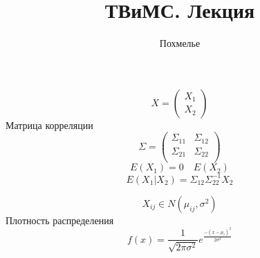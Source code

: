 \documentclass[a4paper]{article}
\begin{document}
\title{ТВиМС. Лекция}
\author{Похмелье}
\maketitle
\[
    X = \begin{pmatrix}
    X_1 \\
    X_2
    
   \end{pmatrix}
\]
Матрица корреляции
\[
    \Sigma = \begin{pmatrix}
    \Sigma_{11} & \Sigma_{12} \\
    \Sigma_{21} & \Sigma_{22}\\
    
    \end{pmatrix}
\]
\[
    E(X_1) = 0 \quad E(X_2)
\]
\[
    E(X_1|X_2) = \Sigma_{12}\Sigma_{22}^{-1}X_2
\]

\[
    X_{ij} \in N(\mu_{ij}, \sigma^2)
\]
Плотность распределения
\[
    f(x) = \frac{1}{\sqrt{2\pi \sigma^2}} e^{\frac{-(x-\mu_{i})^2}{2 \sigma^2}}
\]
\end{document}
